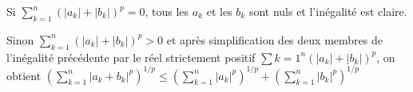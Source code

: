 {\begin{enumerate}
{Si  $\sum_{k=1}^{n}(|a_k|+|b_k|)^p = 0$, tous les $a_k$ et les $b_k$ sont nuls et l'inégalité est claire.

Sinon $\sum_{k=1}^{n}(|a_k|+|b_k|)^p > 0$ et après simplification des deux membres de l'inégalité précédente par le réel strictement positif $\sum{k=1}^{n}(|a_k|+|b_k|)^p$,  on obtient $\left(\sum_{k=1}^{n}|a_k+b_k|^p\right)^{1/p}\leqslant\left(\sum_{k=1}^{n}|a_k|^p\right)^{1/p}+\left(\sum_{k=1}^{n}|b_k|^p\right)^{1/p}$

\begin{center}
\end{center}}
\end{enumerate}
}
